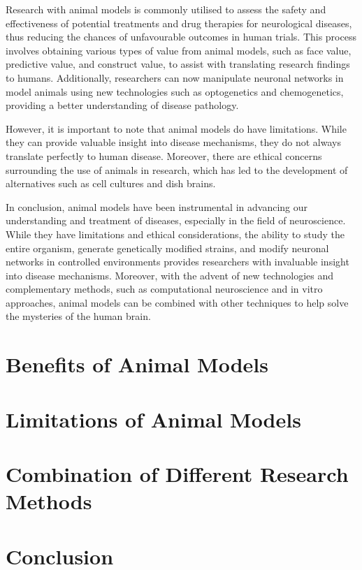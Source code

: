 \documentclass[10pt]{article}
\begin{document}
\begin{sloppypar}
  Research with animal models is commonly utilised to assess the safety and effectiveness of potential treatments and drug therapies for neurological diseases, thus reducing the chances of unfavourable outcomes in human trials. This process involves obtaining various types of value from animal models, such as face value, predictive value, and construct value, to assist with translating research findings to humans. Additionally, researchers can now manipulate neuronal networks in model animals using new technologies such as optogenetics and chemogenetics, providing a better understanding of disease pathology.

  However, it is important to note that animal models do have limitations. While they can provide valuable insight into disease mechanisms, they do not always translate perfectly to human disease. Moreover, there are ethical concerns surrounding the use of animals in research, which has led to the development of alternatives such as cell cultures and dish brains.

  In conclusion, animal models have been instrumental in advancing our understanding and treatment of diseases, especially in the field of neuroscience. While they have limitations and ethical considerations, the ability to study the entire organism, generate genetically modified strains, and modify neuronal networks in controlled environments provides researchers with invaluable insight into disease mechanisms. Moreover, with the advent of new technologies and complementary methods, such as computational neuroscience and in vitro approaches, animal models can be combined with other techniques to help solve the mysteries of the human brain.

  \section{Benefits of Animal Models}
  \label{sec:benefits}

  \section{Limitations of Animal Models}
  \label{sec:limitations}

  \section{Combination of Different Research Methods}
  \label{sec:combination}

  \section{Conclusion}
  \label{sec:conclusion}

  \pagebreak
  
  

\end{sloppypar}
\end{document}
